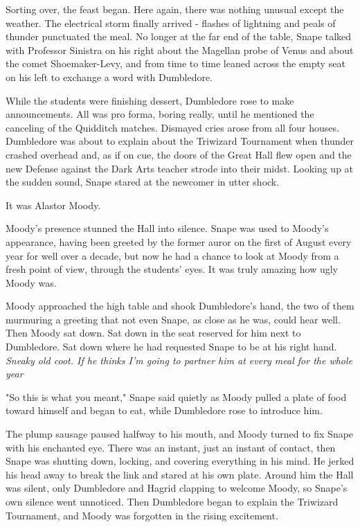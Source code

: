 Sorting over, the feast began. Here again, there was nothing unusual except the weather. The electrical storm finally arrived - flashes of lightning and peals of thunder punctuated the meal. No longer at the far end of the table, Snape talked with Professor Sinistra on his right about the Magellan probe of Venus and about the comet Shoemaker-Levy, and from time to time leaned across the empty seat on his left to exchange a word with Dumbledore.

While the students were finishing dessert, Dumbledore rose to make announcements. All was pro forma, boring really, until he mentioned the canceling of the Quidditch matches. Dismayed cries arose from all four houses. Dumbledore was about to explain about the Triwizard Tournament when thunder crashed overhead and, as if on cue, the doors of the Great Hall flew open and the new Defense against the Dark Arts teacher strode into their midst. Looking up at the sudden sound, Snape stared at the newcomer in utter shock.

It was Alastor Moody.

Moody's presence stunned the Hall into silence. Snape was used to Moody's appearance, having been greeted by the former auror on the first of August every year for well over a decade, but now he had a chance to look at Moody from a fresh point of view, through the students' eyes. It was truly amazing how ugly Moody was.

Moody approached the high table and shook Dumbledore's hand, the two of them murmuring a greeting that not even Snape, as close as he was, could hear well. Then Moody sat down. Sat down in the seat reserved for him next to Dumbledore. Sat down where he had requested Snape to be at his right hand. \emph{Sneaky old coot. If he thinks I'm going to partner him at every meal for the whole year{\el}}

"So this is what you meant," Snape said quietly as Moody pulled a plate of food toward himself and began to eat, while Dumbledore rose to introduce him.

The plump sausage paused halfway to his mouth, and Moody turned to fix Snape with his enchanted eye. There was an instant, just an instant of contact, then Snape was shutting down, locking, and covering everything in his mind. He jerked his head away to break the link and stared at his own plate. Around him the Hall was silent, only Dumbledore and Hagrid clapping to welcome Moody, so Snape's own silence went unnoticed. Then Dumbledore began to explain the Triwizard Tournament, and Moody was forgotten in the rising excitement.

